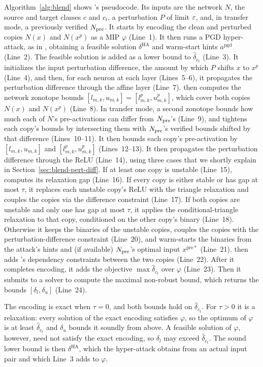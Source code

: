 Algorithm~\ref{alg:blend} shows \tool's pseudocode. Its inputs are the network $N$, the
source and target classes $c$ and $c_t$, a perturbation $P$ of limit $\varepsilon$, and, in transfer mode, a
previously verified $N_{\mathrm{pre}}$. It starts by encoding the clean and perturbed copies $N(x)$ and $N(x^{p})$ as a
MIP $\varphi$ (Line~1). It then runs a PGD hyper-attack, as in \baseline, obtaining a feasible solution $\delta^{\mathrm{HA}}$
and warm-start hints $a^{\mathrm{pgd}}$(Line~2). The feasible solution is added as a lower bound to $\hat\delta_{c_t}$ (Line~3). It initializes the input perturbation difference, the amount by which $P$ shifts $x$ to
$x^{p}$ (Line~4), and then, for each neuron at each layer (Lines~5--6), it propagates the perturbation
difference through the affine layer (Line~7). \tool then computes the
network zonotope bounds $[l_{m,k},u_{m,k}]$${}=[l^{p}_{m,k},u^{p}_{m,k}]$, which cover both copies $N(x)$ and $N(x^{p})$ (Line~8). In transfer
mode, a second zonotope bounds how much each of $N$'s pre-activations can differ from $N_{\mathrm{pre}}$'s
(Line~9), and \tool tightens each copy's bounds by intersecting them with $N_{\mathrm{pre}}$'s verified bounds
shifted by that difference (Lines~10--11). It then bounds each copy's pre-activation by
$[l_{m,k},u_{m,k}]$ and $[l^{p}_{m,k},u^{p}_{m,k}]$ (Lines~12--13). It then propagates the perturbation difference through the ReLU (Line~14), using three cases that we shortly explain in Section~\ref{sec:blend-pert-diff}. 
If at least one copy is unstable (Line~15), \tool computes its relaxation gap (Line~16). 
If every copy is either stable or has gap at most $\tau$, it replaces each unstable copy's ReLU
with the triangle relaxation and couples the copies via the difference constraint (Line~17).
If both copies are unstable and only one has gap at most $\tau$, it applies the
conditional-triangle relaxation to that copy, conditioned on the other copy's binary (Line~18).
Otherwise it keeps the binaries of the unstable copies, couples the copies with the perturbation-difference constraint
(Line~20), and warm-starts the binaries
from the attack's hints and (if available) $N_{\mathrm{pre}}$'s optimal input $x^{\mathrm{pre}*}$ (Line~21). \tool then adds \baseline's
dependency constraints between the two copies (Line~22). After it completes encoding, it adds the objective $\max\hat\delta_{c_t}$ over $\varphi$ (Line~23).
Then it submits to a solver to compute the maximal non-robust bound,
which returns the bounds $[\delta_l,\delta_u]$ (Line~24).

The encoding is exact when $\tau{=}0$, and both bounds hold on
$\hat\delta_{c_t}$. For $\tau>0$ it is a relaxation: every solution of
the exact encoding satisfies $\varphi$, so the optimum of $\varphi$ is
at least $\hat\delta_{c_t}$ and $\delta_u$ bounds it soundly from
above. A feasible solution of $\varphi$, however, need not satisfy the
exact encoding, so $\delta_l$ may exceed $\hat\delta_{c_t}$. The sound
lower bound is then $\delta^{\mathrm{HA}}$, which the hyper-attack
obtains from an actual input pair and which Line~3 adds to $\varphi$.

